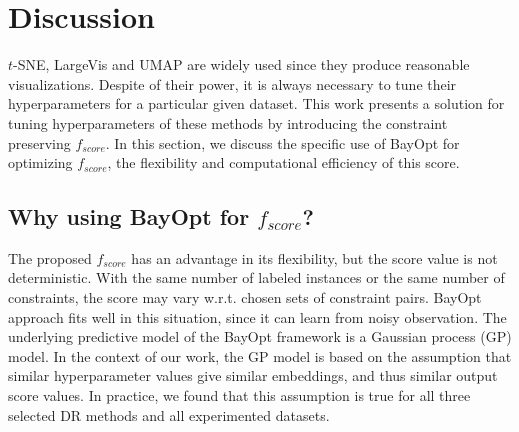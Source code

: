 \section{Discussion}\label{sec:discussion}
$t$-SNE, LargeVis and UMAP are widely used since they produce reasonable visualizations.
Despite of their power, it is always necessary to tune their hyperparameters for a particular given dataset.
This work presents a solution for tuning hyperparameters of these methods by introducing the constraint preserving $f_{score}$.
In this section, we discuss the specific use of BayOpt for optimizing $f_{score}$, the flexibility and computational efficiency of this score.



\subsection{Why using BayOpt for $f_{score}$?}
The proposed $f_{score}$ has an advantage in its flexibility, but the score value is not deterministic.
With the same number of labeled instances or the same number of constraints, the score may vary w.r.t. chosen sets of constraint pairs.
BayOpt approach fits well in this situation, since it can learn from noisy observation.
The underlying predictive model of the BayOpt framework is a Gaussian process (GP) model.
In the context of our work, the GP model is based on the assumption that similar hyperparameter values give similar embeddings, and thus similar output score values.
In practice, we found that this assumption is true for all three selected DR methods and all experimented datasets.

